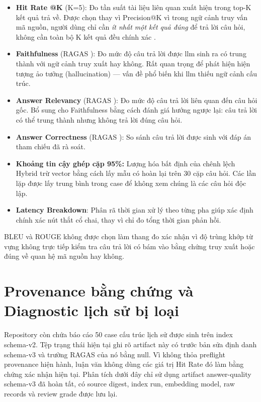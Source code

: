 \documentclass[12pt,a4paper,oneside]{report}
\begin{document}
\begin{itemize}
    \item \textbf{Hit Rate @K} (K=5): Đo tần suất tài liệu liên quan xuất hiện trong top-K kết quả trả về. Được chọn thay vì Precision@K vì trong ngữ cảnh truy vấn mã nguồn, người dùng chỉ cần \textit{ít nhất một kết quả đúng} để trả lời câu hỏi, không cần toàn bộ K kết quả đều chính xác \cite{thakur2021beir}.
    \item \textbf{Faithfulness} (RAGAS \cite{shahul2023ragas}): Đo mức độ câu trả lời được \gls{llm} sinh ra có trung thành với ngữ cảnh truy xuất hay không. Rất quan trọng để phát hiện hiện tượng ảo tưởng (hallucination) --- vấn đề phổ biến khi \gls{llm} thiếu ngữ cảnh cấu trúc.
    \item \textbf{Answer Relevancy} (RAGAS \cite{shahul2023ragas}): Đo mức độ câu trả lời liên quan đến câu hỏi gốc. Bổ sung cho Faithfulness bằng cách đánh giá hướng ngược lại: câu trả lời có thể trung thành nhưng không trả lời đúng câu hỏi.
    \item \textbf{Answer Correctness} (RAGAS \cite{shahul2023ragas}): So sánh câu trả lời được sinh với đáp án tham chiếu đã rà soát.
    \item \textbf{Khoảng tin cậy ghép cặp 95\%:} Lượng hóa bất định của chênh lệch Hybrid trừ vector bằng cách lấy mẫu có hoàn lại trên 30 cặp câu hỏi. Các lần lặp được lấy trung bình trong case để không xem chúng là các câu hỏi độc lập.
    \item \textbf{Latency Breakdown}: Phân rã thời gian xử lý theo từng pha giúp xác định chính xác nút thắt cổ chai, thay vì chỉ đo tổng thời gian phản hồi.
\end{itemize}

BLEU và ROUGE không được chọn làm thang đo xác nhận vì độ trùng khớp từ vựng không trực tiếp kiểm tra câu trả lời có bám vào bằng chứng truy xuất hoặc đúng về quan hệ mã nguồn hay không.

\section{Provenance bằng chứng và Diagnostic lịch sử bị loại}
Repository còn chứa báo cáo 50 case cấu trúc lịch sử được sinh trên index schema-v2. Tệp trạng thái hiện tại ghi rõ artifact này có trước bản sửa định danh schema-v3 và trường RAGAS của nó bằng null. Vì không thỏa preflight provenance hiện hành, luận văn không dùng các giá trị Hit Rate đó làm bằng chứng xác nhận hiện tại. Phân tích dưới đây chỉ sử dụng artifact answer-quality schema-v3 đã hoàn tất, có source digest, index run, embedding model, raw records và review grade được lưu lại.
\end{document}
